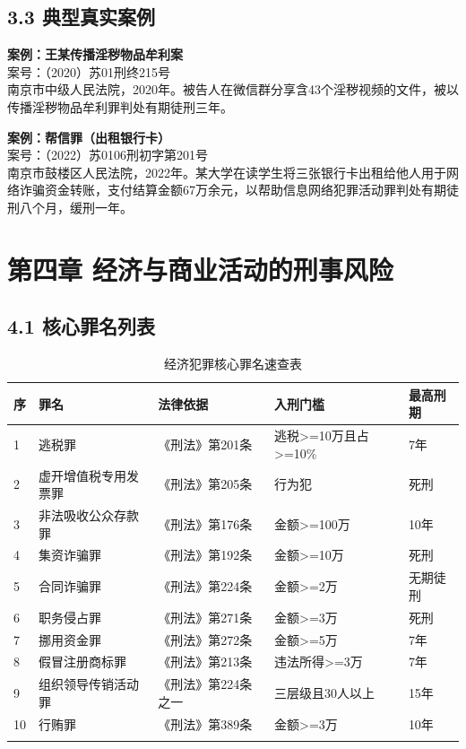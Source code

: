 \documentclass[12pt,a4paper]{article}
\begin{document}
\subsection{3.3 典型真实案例}

\textbf{案例：王某传播淫秽物品牟利案}\\
案号：（2020）苏01刑终215号\\
南京市中级人民法院，2020年。被告人在微信群分享含43个淫秽视频的文件，被以传播淫秽物品牟利罪判处有期徒刑三年。

\textbf{案例：帮信罪（出租银行卡）}\\
案号：（2022）苏0106刑初字第201号\\
南京市鼓楼区人民法院，2022年。某大学在读学生将三张银行卡出租给他人用于网络诈骗资金转账，支付结算金额67万余元，以帮助信息网络犯罪活动罪判处有期徒刑八个月，缓刑一年。

\clearpage

\section{第四章 经济与商业活动的刑事风险}

\subsection{4.1 核心罪名列表}

\begin{longtable}{p{0.5cm}p{4cm}p{3cm}p{3cm}p{2cm}}
  \toprule
  \textbf{序} & \textbf{罪名} & \textbf{法律依据} & \textbf{入刑门槛} & \textbf{最高刑期} \\
  \midrule
  1 & 逃税罪 & 《刑法》第201条 & 逃税>=10万且占>=10\% & 7年 \\
  2 & 虚开增值税专用发票罪 & 《刑法》第205条 & 行为犯 & 死刑 \\
  3 & 非法吸收公众存款罪 & 《刑法》第176条 & 金额>=100万 & 10年 \\
  4 & 集资诈骗罪 & 《刑法》第192条 & 金额>=10万 & 死刑 \\
  5 & 合同诈骗罪 & 《刑法》第224条 & 金额>=2万 & 无期徒刑 \\
  6 & 职务侵占罪 & 《刑法》第271条 & 金额>=3万 & 死刑 \\
  7 & 挪用资金罪 & 《刑法》第272条 & 金额>=5万 & 7年 \\
  8 & 假冒注册商标罪 & 《刑法》第213条 & 违法所得>=3万 & 7年 \\
  9 & 组织领导传销活动罪 & 《刑法》第224条之一 & 三层级且30人以上 & 15年 \\
  10 & 行贿罪 & 《刑法》第389条 & 金额>=3万 & 10年 \\
  \bottomrule
  \caption{经济犯罪核心罪名速查表}
\end{longtable}
\end{document}
